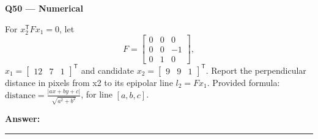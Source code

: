 \documentclass[11pt,a4paper]{article}
\begin{document}
\par\vspace{12pt}
\begin{minipage}{\linewidth}
\textbf{Q50 — Numerical}\par\smallskip
For \(x_2^{\mathsf T}Fx_1=0\),\allowbreak{} let
\[F=\begin{bmatrix}0&0&0\\0&0&-1\\0&1&0\end{bmatrix},\]
 \(x_{1}=\begin{bmatrix}12&7&1\end{bmatrix}^{\mathsf T}\) and candidate \(x_{2}=\begin{bmatrix}9&9&1\end{bmatrix}^{\mathsf T}\). Report the perpendicular distance in pixels from x2 to its epipolar line \(l_2=Fx_1\). Provided formula: \(\text{distance}=\frac{\lvert ax+by+c\rvert}{\sqrt{a^2+b^2}}\),\allowbreak{} for line \([a,b,c]\).
\par\medskip\textbf{Answer:} \rule{55mm}{0.4pt}
\end{minipage}
\par\vspace{12pt}
\end{document}
